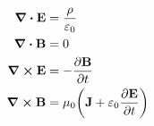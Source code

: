 \begin{align}
    \div{\vb{E}} &= \frac{\rho}{\varepsilon_0} \\
    \div{\vb{B}} &= 0 \\
    \curl{\vb{E}} &= -\pdv{\vb{B}}{t}\\
    \curl{\vb{B}} &= \mu_0\qty(\vb{J} + \varepsilon_0 \pdv{\vb{E}}{t})
\end{align}
